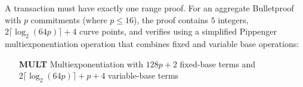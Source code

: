 A transaction must have exactly one range proof. For an aggregate Bulletproof with $p$ commitments (where $p \leq 16$), the proof contains $5$ integers, $2 \lceil \log_2(64p) \rceil + 4$ curve points, and verifies using a simplified Pippenger multiexponentiation operation that combines fixed and variable base operations:

\begin{itemize}
    \setlength\itemsep{\listspace}
    \item [\textbf{MULT}] Multiexponentiation with $128p + 2$ fixed-base terms and $2 \lceil \log_2(64p) \rceil + p + 4$ variable-base terms
\end{itemize}
